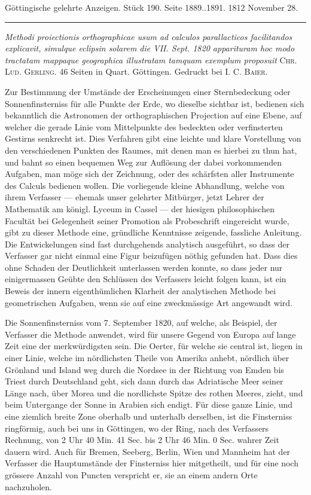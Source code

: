 \clearpage
{}
\hypertarget{native-547-lower}{}\label{native-547-lower}
\begin{center}\small Göttingische gelehrte Anzeigen. Stück 190. Seite 1889..1891. 1812 November 28.\\[3pt]\rule{.72\linewidth}{.3pt}\end{center}

\emph{Methodi proiectionis orthographicae usum ad calculos parallacticos facilitandos explicavit, simulque eclipsin solarem die VII. Sept. \textup{1820} apparituram hoc modo tractatam mappaque geographica illustratam tamquam exemplum proposuit} \textsc{Chr. Lud. Gerling}. 46 Seiten in Quart. Göttingen. Gedruckt bei \textsc{I. C. Baier}.

Zur Bestimmung der Umstände der Erscheinungen einer Sternbedeckung oder Sonnenfinsterniss für alle Punkte der Erde, wo dieselbe sichtbar ist, bedienen sich bekanntlich die Astronomen der orthographischen Projection auf eine Ebene, auf welcher die gerade Linie vom Mittelpunkte des bedeckten oder verfinsterten Gestirns senkrecht ist. Dies Verfahren gibt eine leichte und klare Vorstellung von den verschiedenen Punkten des Raumes, mit denen man es hierbei zu thun hat, und bahnt so einen bequemen Weg zur Auflösung der dabei vorkommenden Aufgaben, man möge sich der Zeichnung, oder des schärfsten aller Instrumente des Calculs bedienen wollen. Die vorliegende kleine Abhandlung, welche von ihrem Verfasser --- ehemals unser gelehrter Mitbürger, jetzt Lehrer der Mathematik am königl. Lyceum in Cassel --- der hiesigen philosophischen Facultät bei Gelegenheit seiner Promotion als Probeschrift eingereicht wurde, gibt zu dieser Methode eine, gründliche Kenntnisse zeigende, fassliche Anleitung. Die Entwickelungen sind fast durchgehends analytisch ausgeführt, so dass der Verfasser gar nicht einmal eine Figur beizufügen nöthig gefunden hat. Dass dies ohne Schaden der Deutlichkeit unterlassen werden konnte, so dass jeder nur einigermassen Geübte den Schlüssen des Verfassers leicht folgen kann, ist ein Beweis der innern eigenthümlichen Klarheit der analytischen Methode bei geometrischen Aufgaben, wenn sie auf eine zweckmässige Art angewandt wird.

Die Sonnenfinsterniss vom 7. September 1820, auf welche, als Beispiel, der Verfasser die Methode anwendet, wird für unsere Gegend von Europa auf lange Zeit eine der merkwürdigsten sein. Die Oerter, für welche sie central ist, liegen in einer Linie, welche im nördlichsten Theile von Amerika anhebt, nördlich über Grönland und Island weg durch die Nordsee in der Richtung von Emden bis Triest durch Deutschland geht, sich dann durch das Adriatische Meer seiner Länge nach, über Morea und die nordlichste Spitze des rothen Meeres, zieht, und beim Untergange der Sonne in Arabien sich endigt. Für diese ganze Linie, und eine ziemlich breite Zone oberhalb und unterhalb derselben, ist die Finsterniss ringförmig, auch bei uns in Göttingen, wo der Ring, nach des Verfassers Rechnung, von 2 Uhr 40 Min. 41 Sec. bis 2 Uhr 46 Min. 0 Sec. wahrer Zeit dauern wird. Auch für Bremen, Seeberg, Berlin, Wien und Mannheim hat der Verfasser die Hauptumstände der Finsterniss hier mitgetheilt, und für eine noch grössere Anzahl von Puncten verspricht er, sie an einem andern Orte nachzuholen.
